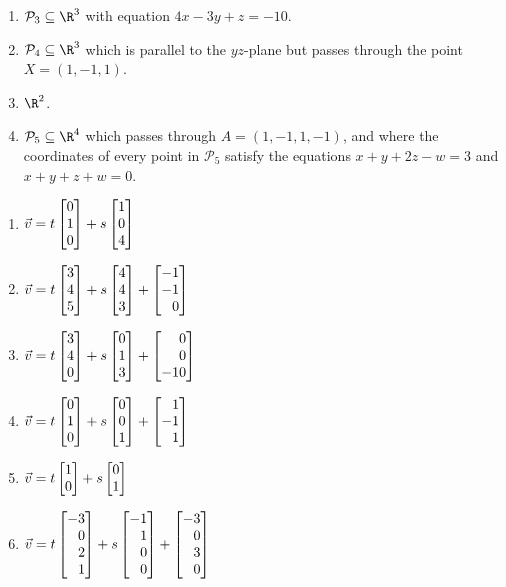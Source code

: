 \begin{exercises}
\begin{problist}
\begin{enumerate}
			\item   $\mathcal P_3\subseteq\R^3$ with equation $4x-3y+z=-10$.
			\item   $\mathcal P_4\subseteq\R^3$ which is parallel to the $yz$-plane but passes through the point $X=(1,-1,1)$.
			\item   $\R^2$.
			\item   $\mathcal P_5\subseteq\R^4$ which passes through $A=(1,-1,1,-1)$,
				and where the coordinates of every point in $\mathcal P_5$ satisfy the equations $x+y+2z-w=3$
				and $x+y+z+w=0$.
		\end{enumerate}
		\begin{solution}
    		\begin{enumerate}
    		    \item $\vec v = t\mat{0\\1\\0} + s\mat{1\\0\\4}$
    		    \item $\vec v = t\mat{3\\4\\5} + s\mat{4\\4\\3} + \mat{-1\\-1\\0}$
    		    \item $\vec v = t\mat{3\\4\\0} + s\mat{0\\1\\3} + \mat{0\\0\\-10}$
    		    \item $\vec v = t\mat{0\\1\\0} + s\mat{0\\0\\1} + \mat{1\\-1\\1}$
    		    \item $\vec v = t\mat{1\\0} + s\mat{0\\1}$
    		    \item $\vec v = t\mat{-3\\0\\2\\1} + s\mat{-1\\1\\0\\0} + \mat{-3\\0\\3\\0}$

\end{enumerate}
\end{solution}
\end{problist}
\end{exercises}
